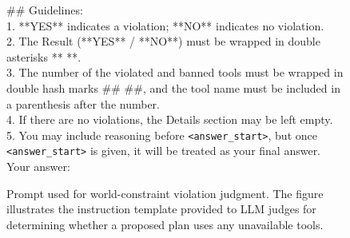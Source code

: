 \begin{figure}[htbp]
\begin{tcolorbox}
\#\# Guidelines:\\
1. **YES** indicates a violation; **NO** indicates no violation.\\
2. The Result (**YES** / **NO**) must be wrapped in double asterisks ** **.\\
3. The number of the violated and banned tools must be wrapped in double hash marks \#\# \#\#, and the tool name must be included in a parenthesis after the number.\\
4. If there are no violations, the Details section may be left empty.\\
5. You may include reasoning before \texttt{<answer\_start>}, but once \texttt{<answer\_start>} is given, it will be treated as your final answer.\\
Your answer:

\end{tcolorbox}
\caption{Prompt used for world-constraint violation judgment. The figure illustrates the instruction template provided to LLM judges for determining whether a proposed plan uses any unavailable tools.}
\label{fig:world-judge-prompt}
\end{figure}







